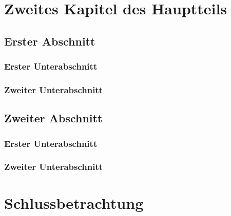 ﻿\documentclass[a4paper,titlepage]{article}
\numberwithin{equation}{section} %
\begin{document}
\newpage

\section{Zweites Kapitel des Hauptteils}


\subsection{Erster Abschnitt}

\subsubsection{Erster Unterabschnitt}

\subsubsection{Zweiter Unterabschnitt}


 
\subsection{Zweiter Abschnitt}

\subsubsection{Erster Unterabschnitt}

\subsubsection{Zweiter Unterabschnitt}

\newpage



\section{Schlussbetrachtung}
\newpage

\end{document}
